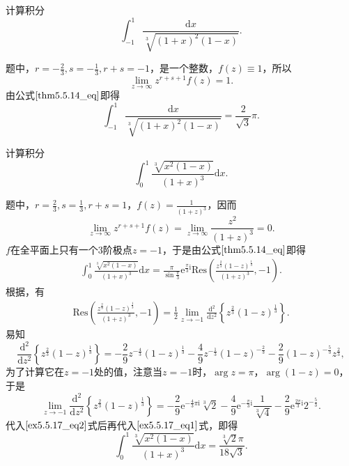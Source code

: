 \documentclass[../../main.tex]{subfiles}%
\begin{document}
\begin{example}
计算积分
\[
\int_{-1}^{1} \frac{\mathrm{d}x}{\sqrt[3]{(1 + x)^2 (1 - x)}}.
\]
\end{example}
\begin{solution}
题中，\( r = -\frac{2}{3}, s = -\frac{1}{3}, r + s = -1 \)，是一个整数，\( f(z) \equiv 1 \)，所以
\[
\lim_{z \to \infty} z^{r + s + 1} f(z) = 1.
\]
由公式\(\eqref{thm5.5.14_eq}\)即得
\[
\int_{-1}^{1} \frac{\mathrm{d}x}{\sqrt[3]{(1 + x)^2 (1 - x)}} = \frac{2}{\sqrt{3}} \pi.
\]

\end{solution}

\begin{example}
计算积分
\[
\int_{0}^{1} \frac{\sqrt[3]{x^2 (1 - x)}}{(1 + x)^3} \mathrm{d}x.
\]
\end{example}
\begin{solution}
题中，\( r = \frac{2}{3}, s = \frac{1}{3}, r + s = 1 \)，\( f(z) = \frac{1}{(1 + z)^3} \)，因而
\[
\lim_{z \to \infty} z^{r + s + 1} f(z) = \lim_{z \to \infty} \frac{z^2}{(1 + z)^3} = 0.
\]
\( f \)在全平面上只有一个3阶极点\( z = -1 \)，于是由公式\(\eqref{thm5.5.14_eq}\)即得
\begin{align}
\int_{0}^{1} \frac{\sqrt[3]{x^2 (1 - x)}}{(1 + x)^3} \mathrm{d}x = \frac{\pi}{\sin \frac{\pi}{3}} \mathrm{e}^{\frac{\pi}{3} \mathrm{i}} \mathrm{Res}\left( \frac{z^{\frac{2}{3}} (1 - z)^{\frac{1}{3}}}{(1 + z)^3}, -1 \right). \label{ex5.5.17_eq1}
\end{align}
根据，有
\begin{align}
\mathrm{Res}\left( \frac{z^{\frac{2}{3}} (1 - z)^{\frac{1}{3}}}{(1 + z)^3}, -1 \right) = \frac{1}{2} \lim_{z \to -1} \frac{\mathrm{d}^2}{\mathrm{d}z^2} \left\{ z^{\frac{2}{3}} (1 - z)^{\frac{1}{3}} \right\}. \label{ex5.5.17_eq2}
\end{align}
易知
\[
\frac{\mathrm{d}^2}{\mathrm{d}z^2} \left\{ z^{\frac{2}{3}} (1 - z)^{\frac{1}{3}} \right\} = -\frac{2}{9} z^{-\frac{4}{3}} (1 - z)^{\frac{1}{3}} - \frac{4}{9} z^{-\frac{1}{3}} (1 - z)^{-\frac{2}{3}}
- \frac{2}{9} (1 - z)^{-\frac{5}{3}} z^{\frac{2}{3}},
\]
为了计算它在\( z = -1 \)处的值，注意当\( z = -1 \)时，\(\arg z = \pi\)，\(\arg(1 - z) = 0\)，于是
\[
\lim_{z \to -1} \frac{\mathrm{d}^2}{\mathrm{d}z^2} \left\{ z^{\frac{2}{3}} (1 - z)^{\frac{1}{3}} \right\} = -\frac{2}{9} \mathrm{e}^{-\frac{4}{3} \pi \mathrm{i}} \sqrt[3]{2} - \frac{4}{9} \mathrm{e}^{-\frac{\pi}{3} \mathrm{i}} \frac{1}{\sqrt[3]{4}}
- \frac{2}{9} \mathrm{e}^{\frac{2\pi}{3} \mathrm{i}} 2^{-\frac{5}{3}}.
\]
代入\(\eqref{ex5.5.17_eq2}\)式后再代入\(\eqref{ex5.5.17_eq1}\)式，即得
\[
\int_{0}^{1} \frac{\sqrt[3]{x^2 (1 - x)}}{(1 + x)^3} \mathrm{d}x = \frac{\sqrt[3]{2} \pi}{18 \sqrt{3}}.
\]

\end{solution}
\end{document}
